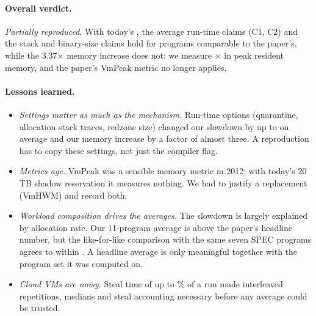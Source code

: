 \paragraph{Overall verdict.}
\emph{Partially reproduced}. With today's \asan{}, the average run-time claims (C1,
C2) and the stack and binary-size claims hold for programs comparable to the
paper's, while the 3.37$\times$ memory increase does not: we measure
\OurMemTotal$\times$ in peak resident memory, and the paper's VmPeak metric no
longer applies.

\paragraph{Lessons learned.}
\begin{itemize}
\item \emph{Settings matter as much as the mechanism.} Run-time options
(quarantine, allocation stack traces, redzone size) changed our slowdown by
up to \CtrlDefDelta{} on average and our memory increase by a factor of
almost three. A reproduction has to copy these settings, not just the
compiler flag.
\item \emph{Metrics age.} VmPeak was a sensible memory metric in 2012; with
today's 20\,TB shadow reservation it measures nothing. We had to justify a
replacement (VmHWM) and record both.
\item \emph{Workload composition drives the averages.} The slowdown is
largely explained by allocation rate. Our 11-program average is
\GapRWAllRel{} above the paper's headline number, but the like-for-like
comparison with the same seven SPEC programs agrees to within
\GapRWMapRel. A headline average is only meaningful together with the
program set it was computed on.
\item \emph{Cloud VMs are noisy.} Steal time of up to \StealMaxPct\% of a run made
interleaved repetitions, medians and steal accounting necessary before any
average could be trusted.
\end{itemize}
